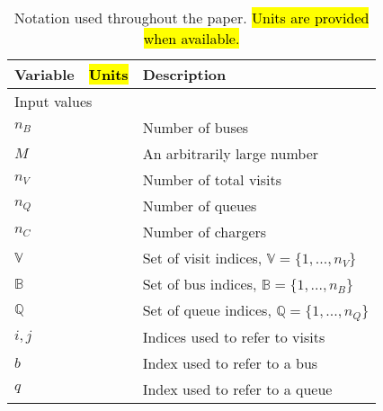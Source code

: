 \documentclass[utf8]{FrontiersinHarvard}
\begin{document}
\begin{table}[!htpb]
  \caption{Notation used throughout the paper. \hl{Units are provided when available.}}
  \label{tab:variables}
  \centering
  \begin{tabularx}{\textwidth}{l l l}
    \toprule
    \textbf{Variable} & \hl{\textbf{Units}} & \textbf{Description}                                                                               \\
    \toprule
    \multicolumn{3}{l}{Input values}                                                                                       \\
    \hline
    $n_B$        & & Number of buses                                                                                                \\
    $M$          & & An arbitrarily large number                                                                                    \\
    $n_V$        & & Number of total visits                                                                                         \\
    $n_Q$        & & Number of queues                                                                                               \\
    $n_C$        & & Number of chargers                                                                                             \\
    $\mathbb{V}$ & & Set of visit indices, $\mathbb{V} = \{1, ..., n_V\}$                                                           \\
    $\mathbb{B}$ & & Set of bus indices, $\mathbb{B} = \{1, ..., n_B\}$                                                             \\
    $\mathbb{Q}$          & & Set of queue indices, $\mathbb{Q} = \{1, ..., n_Q\}$                                                                    \\
    $i,j$        & & Indices used to refer to visits                                                                                \\
    $b$          & & Index used to refer to a bus                                                                                   \\
    $q$          & & Index used to refer to a queue                                                                                 \\
    \hline

\end{tabularx}
\end{table}
\end{document}
